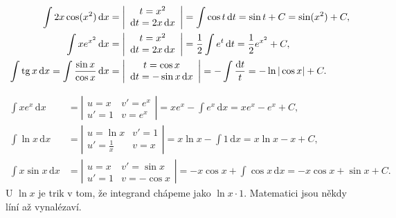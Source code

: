 \begin{example}[ (substituce)]
  \begin{align*}
    \int 2x\cos(x^2)\,\mathrm{d}x &= \left|\begin{array}{c} t = x^2\\ \mathrm{d}t = 2x\,\mathrm{d}x \end{array}\right| = \int\cos t\,\mathrm{d}t = \sin t + C = \sin(x^2) + C,\\
    \int xe^{x^2}\,\mathrm{d}x &= \left|\begin{array}{c} t = x^2\\ \mathrm{d}t = 2x\,\mathrm{d}x \end{array}\right| = \frac{1}{2}\int e^t\,\mathrm{d}t = \frac{1}{2}e^{x^2} + C,\\
    \int\operatorname{tg} x\,\mathrm{d}x = \int\frac{\sin x}{\cos x}\,\mathrm{d}x &= \left|\begin{array}{c} t = \cos x\\ \mathrm{d}t = -\sin x\,\mathrm{d}x \end{array}\right| = -\int\frac{\mathrm{d}t}{t} = -\ln|\cos x| + C.
  \end{align*}
\end{example}

\begin{example}
  \begin{align*}
    \int xe^x\,\mathrm{d}x &= \left|\begin{array}{cc} u = x & v' = e^x\\ u' = 1 & v = e^x \end{array}\right| = xe^x - \int e^x\,\mathrm{d}x = xe^x - e^x + C,\\
    \int\ln x\,\mathrm{d}x &= \left|\begin{array}{cc} u = \ln x & v' = 1\\ u' = \frac{1}{x} & v = x \end{array}\right| = x\ln x - \int 1\,\mathrm{d}x = x\ln x - x + C,\\
    \int x\sin x\,\mathrm{d}x &= \left|\begin{array}{cc} u = x & v' = \sin x\\ u' = 1 & v = -\cos x \end{array}\right| = -x\cos x + \int\cos x\,\mathrm{d}x = -x\cos x + \sin x + C.
  \end{align*}
  U $\ln x$ je trik v tom, že integrand chápeme jako $\ln x\cdot 1$. Matematici jsou někdy líní až vynalézaví.
\end{example}

